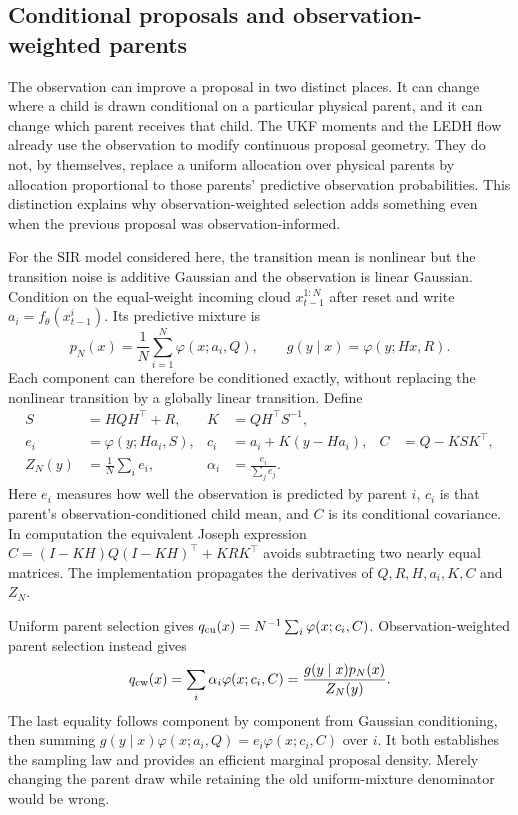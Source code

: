 \subsection{Conditional proposals and observation-weighted parents}
\label{sec:observation-weighted-default}
The observation can improve a proposal in two distinct places. It can change
where a child is drawn conditional on a particular physical parent, and it can
change which parent receives that child. The UKF moments and the LEDH flow
already use the observation to modify continuous proposal geometry. They do
not, by themselves, replace a uniform allocation over physical parents by
allocation proportional to those parents' predictive observation probabilities.
This distinction explains why observation-weighted selection adds something
even when the previous proposal was observation-informed.

For the SIR model considered here, the transition mean is nonlinear but the
transition noise is additive Gaussian and the observation is linear Gaussian.
Condition on the equal-weight incoming cloud $x_{t-1}^{1:N}$ after reset and
write $a_i=f_\theta(x_{t-1}^i)$. Its predictive mixture is
\begin{equation}
 p_N(x)=\frac1N\sum_{i=1}^N\varphi(x;a_i,Q),\qquad
 g(y\mid x)=\varphi(y;Hx,R).
\end{equation}
Each component can therefore be conditioned exactly, without replacing the
nonlinear transition by a globally linear transition. Define
\begin{align}
 S&=HQH^\top+R,& K&=QH^\top S^{-1},\\
 e_i&=\varphi(y;Ha_i,S),&
 c_i&=a_i+K(y-Ha_i),& C&=Q-KSK^\top,\\
 Z_N(y)&=\frac1N\sum_i e_i,&
 \alpha_i&=\frac{e_i}{\sum_j e_j}.
\end{align}
Here $e_i$ measures how well the observation is predicted by parent $i$,
$c_i$ is that parent's observation-conditioned child mean, and $C$ is its
conditional covariance. In computation the equivalent Joseph expression
$C=(I-KH)Q(I-KH)^\top+KRK^\top$ avoids subtracting two nearly equal matrices.
The implementation propagates the derivatives of $Q,R,H,a_i,K,C$ and $Z_N$.

Uniform parent selection gives
$q_{\rm cu}(x)=N^{-1}\sum_i\varphi(x;c_i,C)$. Observation-weighted parent
selection instead gives
\begin{equation}
 q_{\rm cw}(x)=\sum_i\alpha_i\varphi(x;c_i,C)
             =\frac{g(y\mid x)p_N(x)}{Z_N(y)}.
 \label{eq:observation-weighted-bayes-identity}
\end{equation}
The last equality follows component by component from Gaussian conditioning,
then summing $g(y\mid x)\varphi(x;a_i,Q)=e_i\varphi(x;c_i,C)$ over $i$.
It both establishes the sampling law and provides an efficient marginal
proposal density. Merely changing the parent draw while retaining the old
uniform-mixture denominator would be wrong.

